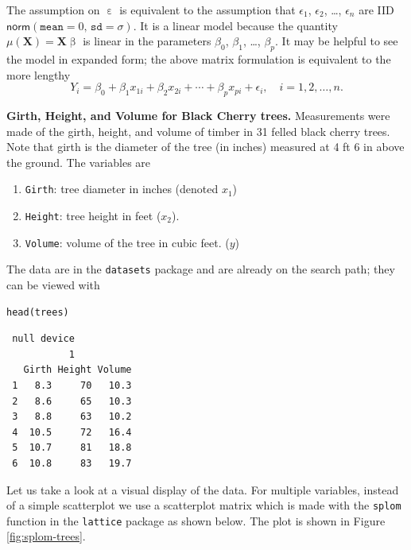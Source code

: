 \documentclass[captions=tableheading]{scrbook}
\begin{document}
The assumption on \(\upepsilon\) is equivalent to the assumption that \(\epsilon_{1}\), \(\epsilon_{2}\), \ldots{}, \(\epsilon_{n}\) are IID \(\mathsf{norm}(\mathtt{mean}=0,\,\mathtt{sd}=\sigma)\). It is a linear model because the quantity \(\mu(\mathbf{X})=\mathbf{X}\upbeta\) is linear in the parameters \(\beta_{0}\), \(\beta_{1}\), \ldots{}, \(\beta_{p}\). It may be helpful to see the model in expanded form; the above matrix formulation is equivalent to the more lengthy
\begin{equation} 
Y_{i}=\beta_{0}+\beta_{1}x_{1i}+\beta_{2}x_{2i}+\cdots+\beta_{p}x_{pi}+\epsilon_{i},\quad i=1,2,\ldots,n.
\end{equation}

\begin{example}
\textbf{Girth, Height, and Volume for Black Cherry trees.} 
Measurements were made of the girth, height, and volume of timber in 31 felled black cherry trees. Note that girth is the diameter of the tree (in inches) measured at 4 ft 6 in above the ground. The variables are

\begin{enumerate}
\item \texttt{Girth}: tree diameter in inches (denoted \(x_{1}\))
\item \texttt{Height}: tree height in feet (\(x_{2}\)).
\item \texttt{Volume}: volume of the tree in cubic feet. (\(y\))
\end{enumerate}

The data are in the \texttt{datasets} package and are already on the search path; they can be viewed with


\begin{verbatim}
head(trees)
\end{verbatim}

\begin{verbatim}
 null device 
           1
   Girth Height Volume
 1   8.3     70   10.3
 2   8.6     65   10.3
 3   8.8     63   10.2
 4  10.5     72   16.4
 5  10.7     81   18.8
 6  10.8     83   19.7
\end{verbatim}

Let us take a look at a visual display of the data. For multiple variables, instead of a simple scatterplot we use a scatterplot matrix which is made with the \texttt{splom} function in the \texttt{lattice} package \cite{Sarkarlattice} as shown below. The plot is shown in Figure \ref{fig:splom-trees}.



\end{example}
\end{document}
